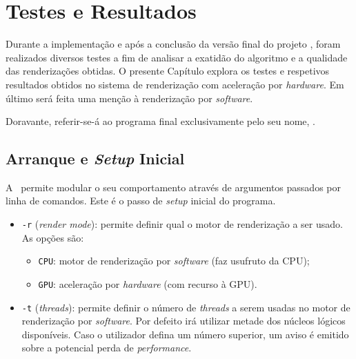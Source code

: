 \chapter{Testes e Resultados}
\label{ch::testes}


Durante a implementação e após a conclusão da versão final do projeto \theapp, foram realizados diversos testes a fim de analisar a exatidão do algoritmo e a qualidade das renderizações obtidas. O presente Capítulo explora os testes e respetivos resultados obtidos no sistema de renderização com aceleração por \textit{hardware}. Em último será feita uma menção à renderização por \textit{software}.

Doravante, referir-se-á ao programa final exclusivamente pelo seu nome, \theapp.


\section{Arranque e \textit{Setup} Inicial}
\label{sec::testes::start}

A \theapp~permite modular o seu comportamento através de argumentos passados por linha de comandos. Este é o passo de \textit{setup} inicial do programa.

\begin{itemize}
	\item \verb|-r| (\textit{render mode}): permite definir qual o motor de renderização a ser usado. As opções são:
	\begin{itemize}[nosep]
		\item \verb|CPU|: motor de renderização por \textit{software} (faz usufruto da \ac{CPU});
		\item \verb|GPU|: aceleração por \textit{hardware} (com recurso à \ac{GPU}).
	\end{itemize}
	
	\item \verb|-t| (\textit{threads}): permite definir o número de \textit{threads} a serem usadas no motor de renderização por \textit{software}. Por defeito irá utilizar metade dos núcleos lógicos disponíveis. Caso o utilizador defina um número superior, um aviso é emitido sobre a potencial perda de \textit{performance}.
\end{itemize}


